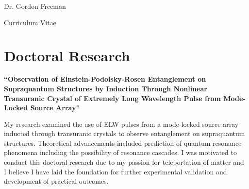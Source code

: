 \documentclass[
    10pt, %
]{FreemanCV}
\begin{document}
\begin{paracol}{2} %


\parbox[][0.11\textheight][c]{\linewidth}{ %
    \centering %

    {\sffamily\Huge Dr. Gordon Freeman} %

    \medskip %

    {\cursivefont\Huge\textcolor{headings}{Curriculum Vitae}}

    \vfill %
}


\section{Doctoral Research}

{\raggedright\textbf{``Observation of Einstein-Podolsky-Rosen Entanglement on Supraquantum Structures by Induction Through Nonlinear Transuranic Crystal of Extremely Long Wavelength Pulse from Mode-Locked Source Array"}\par}

\medskip %

My research examined the use of ELW pulses from a mode-locked source array inducted through transuranic crystals to observe entanglement on supraquantum structures. Theoretical advancements included prediction of quantum resonance phenomena including the possibility of resonance cascades. I was motivated to conduct this doctoral research due to my passion for teleportation of matter and I believe I have laid the foundation for further experimental validation and development of practical outcomes.

\medskip %



\end{paracol}
\end{document}
